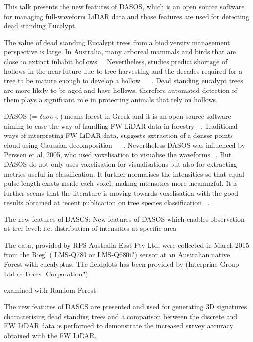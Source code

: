 \documentclass{subfiles}
\begin{document}
This talk presents the new features of DASOS, which is an open source software for managing full-waveform LiDAR data and those features are used for detecting dead standing Eucalypt.

The value of dead standing Eucalypt trees from a biodiversity management perspective is large. In Australia, many arboreal mammals and birds that are close to extinct inhabit hollows ~\cite{Gibbons2002}. Nevertheless, studies predict shortage of hollows in the near future due to tree harvesting and the decades required for a tree to be mature enough to develop a hollow ~\cite{Lindenmayer2010} ~\cite{Goldingay2009}. Dead standing eucalypt trees are more likely to be aged and have hollows, therefore automated detection of them plays a significant role in protecting animals that rely on hollows. 

DASOS (= $\delta\acute{a}\sigma o\varsigma$) means forest in Greek and it is an open source software aiming to ease the way of handling FW LiDAR data in forestry ~\cite{Miltiadou2015}. Traditional ways of interpreting FW LiDAR data, suggests extraction of a denser points cloud using Gaussian decomposition ~\cite{Neuenschwander2009} ~\cite{Reitberger2008}. Nevertheless DASOS was influenced by Persson et al, 2005, who used voxelisation to visualise the waveforms ~\cite{Persson2005}. But, DASOS do not only uses voxelisation for visualisations but also for extracting metrics useful in classification. It further normalises the intensities so that equal pulse length exists inside each voxel, making intensities more meaningful. It is further seems that the literature is moving towards voxelisation with the good results obtained at recent publication on tree species classification ~\cite{Cao2016}. 

The new features of DASOS: New features of DASOS which enables observation at tree level: i.e. distribution of intensities at specific area

The data, provided by RPS Australia East Pty Ltd, were collected in March 2015 from the Riegl ( LMS-Q780 or LMS-Q680i?) sensor at an Australian native Forest with eucalyptus. The fieldplots has been provided by (Interprine Group Ltd or Forest Corporation?). 

examined with Random Forest



The new features of DASOS are presented and used for generating 3D signatures characterising dead standing trees and a comparison between the discrete and FW LiDAR data is performed to demonstrate the increased survey accuracy obtained with the FW LiDAR. 
\end{document}
